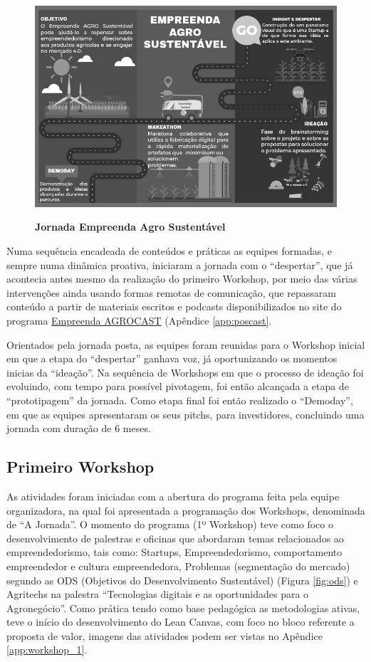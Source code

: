 \begin{figure}[H]
\centering
\caption{\textbf{Jornada Empreenda Agro Sustentável}}
\includegraphics[scale=0.5]{Imagens/jornada.png}
\label{figura_17}
\end{figure}


Numa sequência encadeada de conteúdos e práticas as equipes formadas, e sempre numa dinâmica proativa, iniciaram a jornada com o “despertar”, que já acontecia antes mesmo da realização do primeiro Workshop, por meio das várias intervenções ainda usando formas remotas de comunicação, que repassaram conteúdo a partir de materiais escritos e  podcasts disponibilizados no site do programa \href{https://open.spotify.com/show/3c25hRSxvaCFPw6Y3lX3i1?si=9H_fGz_uRgGiFNhAcdr4rQ}{Empreenda AGROCAST} (Apêndice \ref{app:poscast}. 

Orientados pela jornada posta, as equipes foram reunidas para o Workshop inicial em que a etapa do “despertar” ganhava voz, já oportunizando os momentos inicias da “ideação”. Na sequência de Workshops em que o processo de ideação foi evoluindo, com tempo para possível pivotagem, foi então alcançada a etapa   de “prototipagem” da jornada. Como etapa final foi então realizado o “Demoday”, em que as equipes apresentaram os seus pitchs, para investidores, concluindo uma jornada com duração de 6 meses.


\subsection{Primeiro Workshop}

As atividades foram iniciadas com a abertura do programa feita pela equipe organizadora, na qual foi apresentada a programação dos Workshops, denominada de “A Jornada”. O momento do programa (1º Workshop) teve como foco o desenvolvimento de palestras e oficinas que abordaram temas relacionados ao empreendedorismo, tais como: Startups, Empreendedorismo, comportamento empreendedor e cultura empreendedora, Problemas (segmentação do mercado) segundo as ODS (Objetivos do Desenvolvimento Sustentável) (Figura \ref{fig:ods}) e Agritechs na palestra “Tecnologias digitais e as oportunidades para o Agronegócio”. Como prática tendo como base pedagógica as metodologias ativas, teve o início do desenvolvimento do Lean Canvas, com foco no bloco referente a proposta de valor, imagens das atividades podem ser vistas no Apêndice \ref{app:workshop_1}.

